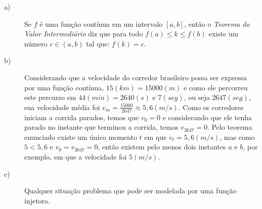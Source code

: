 \documentclass[12pt]{article}
\begin{document}
\begin{description}

\item[a)] Se $f$ é uma função contínua em um intervalo $[a,b]$, então o \emph{Teorema do Valor Intermediário} diz que para todo $f(a)\leq k \leq f(b)$ existe um número $c\in (a,b)$ tal que: $f(k)=c$. 

\item[b)] Considerando que a velocidade do corredor brasileiro possa ser expressa por uma função contínua, $15 (km)= 15000 (m)$ e como ele percorreu este percurso em $44 (min)= 2640 (s)$ e $7 (seg)$, ou seja $2647 (seg)$, sua velocidade média foi $\displaystyle v_m= \frac{15000}{2647}\approx 5,6 (m/s)$. Como os corredores iniciam a corrida parados, temos que $v_0=0$ e considerando que ele tenha parado no instante que terminou a corrida, temos $v_{2647}=0$. Pelo teorema enunciado existe um único momento $t$ em que $v_t=5,6 (m/s)$, mas como $5<5,6$ e $v_0=v_{2647}=0$, então existem pelo menos dois instantes $a$ e $b$, por exemplo, em que a velocidade foi $5 (m/s)$.

\item[c)] Qualquer situação problema que pode ser modelada por uma função injetora.

\end{description}
\end{document}
